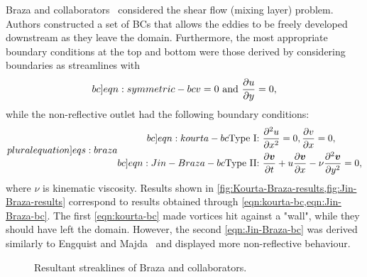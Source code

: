\documentclass{article}
\numberwithin{equation}{section}
\begin{document}
Braza and collaborators~\cite{Jin:1993,Kourta:1987,Persillon:1998} considered the shear flow (mixing layer) problem. Authors constructed a set of BCs that allows the eddies to be freely developed downstream as they leave the domain. Furthermore, the most appropriate boundary conditions at the top and bottom were those derived by considering boundaries as streamlines with
\begin{equation}\label[bc]{eqn:symmetric-bc}
	v=0\text{ and } \frac{\partial u}{\partial y}=0,
\end{equation}
while the non-reflective outlet had the following boundary conditions: 
\begin{subequations}
\label[pluralequation]{eqs:braza}
\begin{align}
\label[bc]{eqn:kourta-bc}
	\text{Type I: }&\frac{\partial ^2u}{\partial x^2}=0,\frac{\partial v}{\partial x	}=0,\\
\label[bc]{eqn:Jin-Braza-bc}
	\text{Type II: }&\frac{\partial \boldsymbol{v}}{\partial t}+u\frac{\partial \boldsymbol{v}}{\partial x}-\nu \frac{\partial^2 \boldsymbol{v}}{\partial y^2}=0,
\end{align}
\end{subequations}
where $\nu$ is kinematic viscosity. 
Results shown in \cref{fig:Kourta-Braza-results,fig:Jin-Braza-results} correspond to results obtained through \cref{eqn:kourta-bc,eqn:Jin-Braza-bc}.
	The first \cref{eqn:kourta-bc} made vortices hit against a "wall", while they should have left the domain. 
	However, the second \cref{eqn:Jin-Braza-bc} was derived similarly to Engquist and Majda~\cite{Engquist:1977} and displayed more non-reflective behaviour. 
\begin{figure}[H]
\centering
   \quad
\caption{\small Resultant streaklines of Braza and collaborators.}
\end{figure}
\end{document}
